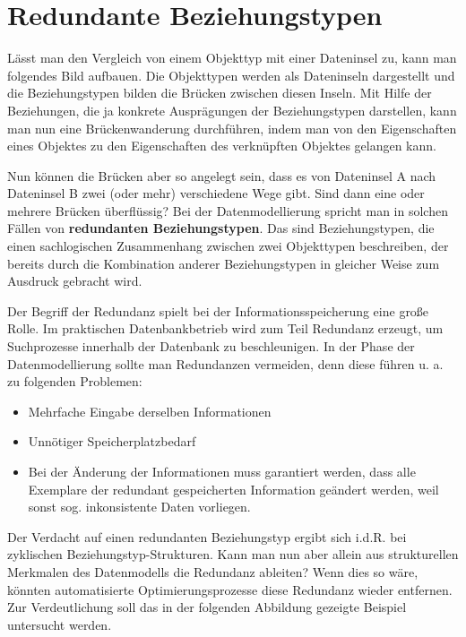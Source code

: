      \section{Redundante Beziehungstypen}
        L\"asst man den Vergleich von einem Objekttyp mit einer Dateninsel zu, kann man folgendes Bild aufbauen. Die Objekttypen werden als Dateninseln dargestellt und die Beziehungstypen bilden die Br\"ucken zwischen diesen Inseln. Mit Hilfe der Beziehungen, die ja konkrete Auspr\"agungen der Beziehungstypen darstellen, kann man nun eine Br\"uckenwanderung durchf\"uhren, indem man von den Eigenschaften eines Objektes zu den Eigenschaften des verkn\"upften Objektes gelangen kann.

        Nun k\"onnen die Br\"ucken aber so angelegt sein, dass es von Dateninsel A nach Dateninsel B zwei (oder mehr) verschiedene Wege gibt. Sind dann eine oder mehrere Br\"ucken \"uberfl\"ussig? Bei der Datenmodellierung spricht man in solchen F\"allen von \textbf{redundanten Beziehungstypen}. Das sind Beziehungstypen, die einen sachlogischen Zusammenhang zwischen zwei Objekttypen beschreiben, der bereits durch die Kombination anderer Beziehungstypen in gleicher Weise zum Ausdruck gebracht wird.

        Der Begriff der Redundanz spielt bei der Informationsspeicherung eine gro\ss e Rolle. Im praktischen Datenbankbetrieb wird zum Teil Redundanz erzeugt, um Suchprozesse innerhalb der Datenbank zu beschleunigen. In der Phase der Datenmodellierung sollte man Redundanzen vermeiden, denn diese f\"uhren u. a. zu folgenden Problemen:
        \begin{itemize}
          \item Mehrfache Eingabe derselben Informationen
          \item Unn\"otiger Speicherplatzbedarf
          \item Bei der \"Anderung der Informationen muss garantiert werden, dass alle Exemplare der redundant gespeicherten Information ge\"andert werden, weil sonst sog. inkonsistente Daten vorliegen.
        \end{itemize}

        Der Verdacht auf einen redundanten Beziehungstyp ergibt sich i.d.R. bei zyklischen Be\-zieh\-ungs\-typ-Struk\-turen. Kann man nun aber allein aus strukturellen Merkmalen des Datenmodells die Redundanz ableiten? Wenn dies so w\"are, k\"onnten automatisierte Optimierungsprozesse diese Redundanz wieder entfernen. Zur Verdeutlichung soll das in der folgenden Abbildung gezeigte Beispiel untersucht werden.

